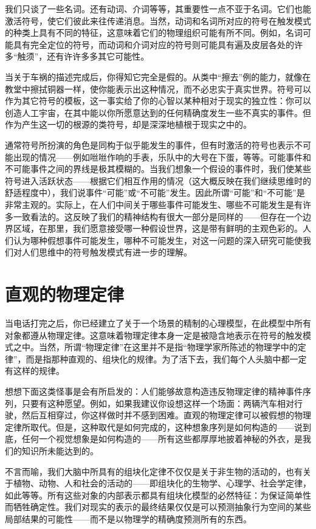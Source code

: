 我们只谈了一些名词。还有动词、介词等等，其重要性一点不亚于名词。它们也能激活符号，使它们彼此来往传递消息。当然，动词和名词所对应的符号在触发模式的种类上具有不同的特征，这意味着它们的物理组织可能有所不同。例如，名词可能具有完全定位的符号，而动词和介词对应的符号则可能具有遍及皮层各处的许多“触须”，还有许许多多其它可能性。

当关于车祸的描述完成后，你得知它完全是假的。从类中“擦去”例的能力，就像在教堂中擦拭铜器一样，使你能表示出这种情况，而不必忠实于真实世界。符号可以作为其它符号的模板，这一事实给了你的心智以某种相对于现实的独立性：你可以创造人工宇宙，在其中能以你所愿意达到的任何精确度发生一些不真实的事件。但作为产生这一切的根源的类符号，却是深深地植根于现实之中的。

通常符号所扮演的角色是同构于似乎能发生的事件，但有时激活的符号也表示不可能出现的情况——例如咝咝作响的手表，乐队中的大号在下蛋，等等。可能事件和不可能事件之间的界线是极其模糊的。当我们想象一个假设的事件时，我们使某些符号进入活跃状态——根据它们相互作用的情况（这大概反映在我们继续思维时的舒适程度中），我们说事件“可能”或“不可能”发生。因此所谓“可能”和“不可能”是非常主观的。实际上，在人们中间关于哪些事件可能发生、哪些不可能发生是有许多一致看法的。这反映了我们的精神结构有很大一部分是同样的——但存在一个边界区域，在那里，我们愿意接受哪一种假设世界，这是带有鲜明的主观色彩的。人们认为哪种假想事件可能发生，哪种不可能发生，对这一问题的深入研究可能使我们对人们思维中的符号触发模式有进一步的理解。

\section{直观的物理定律}

当电话打完之后，你已经建立了关于一个场景的精制的心理模型，在此模型中所有对象都遵从物理定律。这意味着物理定律本身一定是被隐含地表示在符号的触发模式之中。当然，所谓“物理定律”在这里并不是指“物理学家所陈述的物理学中的定律”，而是指那种直观的、组块化的规律。为了活下去，我们每个人头脑中都一定有这样的规律。

想想下面这类怪事是会有所启发的：人们能够故意构造违反物理定律的精神事件序列，只要有这种愿望。例如，如果我建议你设想这样一个场面：两辆汽车相对行驶，然后互相穿过，你这样做时并不感到困难。直观的物理定律可以被假想的物理定律所取代。但是，这种取代是如何完成的，这种想象序列是如何构造的——说到底，任何一个视觉想象是如何构造的——所有这些都厚厚地披着神秘的外衣，是我们的知识所未能达到的。

不言而喻，我们大脑中所具有的组块化定律不仅仅是关于非生物的活动的，也有关于植物、动物、人和社会的活动的——即组块化的生物学、心理学、社会学定律，如此等等。所有这些对象的内部表示都具有组块化模型的必然特征：为保证简单性而牺牲确定性。我们对现实的表示的最终结果仅仅是可以预测抽象行为空间的某些局部结果的可能性——而不是以物理学的精确度预测所有的东西。


